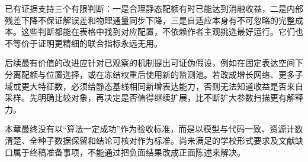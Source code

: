 已有证据支持三个有限判断：一是合理静态配额有时已能达到消融收益，二是内部残差下降不保证解误差和物理通量同步下降，三是自适应本身有不可忽略的完整成本。这些判断都能在表格中找到对应配置，不依赖作者主观挑选最好运行。它们也不等价于证明更精细的联合指标永远无用。

后续最有价值的改进应针对已观察的机制提出可证伪假设，例如在固定表达空间下分离配额与位置选择，或在冻结权重后使用新的监测池。若改成增长网络、更多子域或更大特征数，必须给静态基线相同新增表达能力，否则无法知道收益是否来自采样。先明确比较对象，再决定是否值得继续扩展，比不断扩大参数扫描更有解释力。

本章最终没有以“算法一定成功”作为验收标准，而是以模型与代码一致、资源计数清楚、全种子数据保留和结论可核对作为标准。尚未满足的学校形式要求及文献缺口属于终稿准备事项，不能通过把负面结果改成正面陈述来解决。

